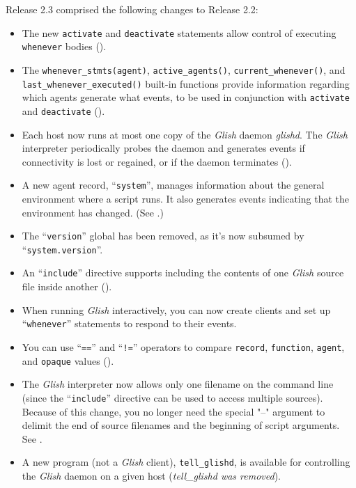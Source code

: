 Release 2.3 comprised the following changes to Release 2.2:
\begin{itemize}

\item The new \texttt{activate} and \texttt{deactivate} statements allow
control of executing \texttt{whenever} bodies ().

\item The \texttt{whenever\_stmts(agent)}, \texttt{active\_agents()},
\texttt{current\_whenever()}, and \texttt{last\_whenever\_executed()}
built-in functions provide information regarding which agents
generate what events, to be used in conjunction with \texttt{activate}
and \texttt{deactivate} ().

\item Each host now runs at most one copy of the \emph{Glish} daemon \emph{glishd\/}.
The \emph{Glish} interpreter periodically probes the daemon and generates events
if connectivity is lost or regained, or if the daemon terminates
().

\item A new agent record, ``\texttt{system}'', manages information about the
general environment where  a script runs.  It also generates events
indicating that the environment has changed.  (See .)

\item The ``\texttt{version}'' global has been removed, as it's now
subsumed by ``\texttt{system.version}''.

\item An ``\texttt{include}'' directive supports including the contents
of one \emph{Glish} source file inside another ().

\item When running \emph{Glish} interactively, you can now create clients
and set up ``\texttt{whenever}'' statements to respond to their events.

\item You can use ``\verb+==+'' and ``\verb+!=+'' operators to compare
\texttt{record}, \texttt{function}, \texttt{agent}, and \texttt{opaque} values
().

\item The \emph{Glish} interpreter now allows only one filename on the command
line (since the ``\texttt{include}'' directive can be used to access multiple
sources).  Because of this change, you no longer need the special "--"
argument to delimit the end of source filenames and the beginning of script
arguments.  See .

\item A new program (not a \emph{Glish} client), \texttt{tell\_glishd}, is available
for controlling the \emph{Glish} daemon on a given host (\emph{tell\_glishd was removed}).

\end{itemize}

